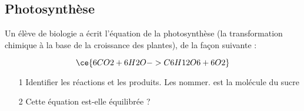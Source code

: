 \documentclass[a4paper,12pt]{article}
\begin{document}
\subsection{Photosynthèse}

Un élève de biologie a écrit l'équation de la photosynthèse (la transformation chimique à la base de la croissance des plantes), de la façon suivante : \par 
\[
\ce{6CO2 + 6H2O -> C6H12O6 + 6O2}
\]
 
\begin{itemize}[noitemsep]
  \item[1] Identifier les réactions et les produits. Les nommer.  est la molécule du sucre
  \item[2] Cette équation est-elle équilibrée ? 
 \end{itemize}
\end{document}
